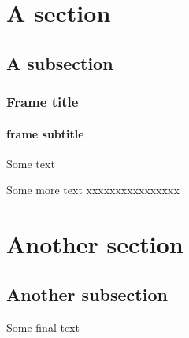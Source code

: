 \documentclass[14pt]{beamer}%
\begin{document}
\begin{frame}

\end{frame}

\section{A section}
\subsection{A subsection}
\begin{frame}
\frametitle{Frame title}
\framesubtitle{frame subtitle}Some text
\end{frame}

\begin{frame}Some more text
xxxxxxxxxxxxxxxx
\end{frame}

\section{Another section}
\subsection{Another subsection}
\begin{frame}Some final text
\end{frame}
\end{document}
